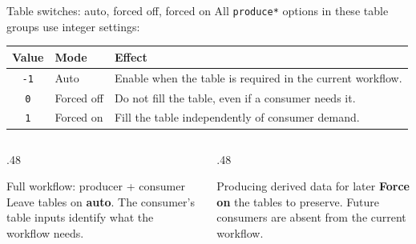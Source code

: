 \begin{frame}{Table switches: auto, forced off, forced on}
 \small All \texttt{produce*} options in these table groups use integer settings:
 \medskip
 \renewcommand{\arraystretch}{1.45}
 \begin{tabular}{clp{}}
 \toprule
 Value & Mode & Effect\\
 \midrule
 \texttt{-1} & Auto & Enable when the table is required in the current workflow.\\
 \texttt{0} & Forced off & Do not fill the table, even if a consumer needs it.\\
 \texttt{1} & Forced on & Fill the table independently of consumer demand.\\
 \bottomrule
 \end{tabular}
 \medskip
 \begin{columns}[T]
 \begin{column}{.48\textwidth}
 \begin{block}{Full workflow: producer + consumer}
 Leave tables on \textbf{auto}. The consumer's table inputs identify what the workflow needs.
 \end{block}
 \end{column}
 \begin{column}{.48\textwidth}
 \begin{block}{Producing derived data for later}
 \textbf{Force on} the tables to preserve. Future consumers are absent from the current workflow.
 \end{block}
 \end{column}
 \end{columns}
\end{frame}

